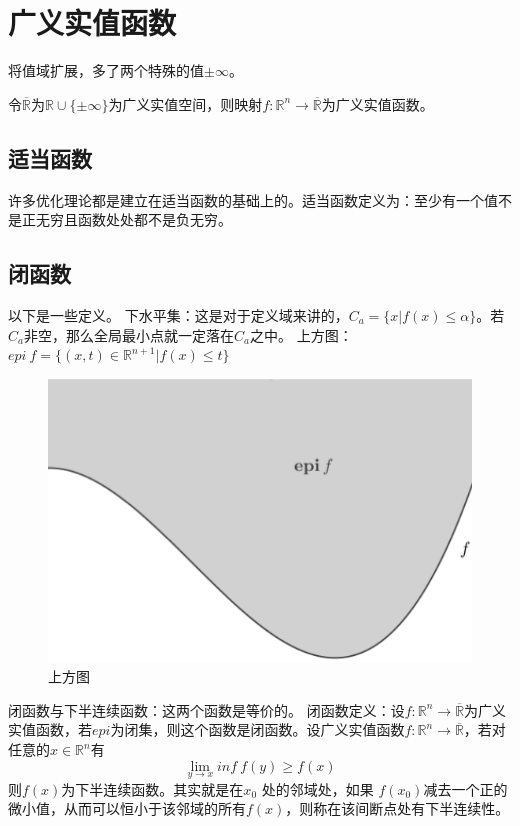 \documentclass{article}
\begin{document}
\section{广义实值函数}
将值域扩展，多了两个特殊的值$\pm\infty$。
\begin{definition}
    令$\overline{\mathbb {R}}$为$\mathbb {R} \cup \{ \pm\infty \}$为广义实值空间，则映射$f:\mathbb {R}^n \rightarrow \overline{\mathbb {R}} $为广义实值函数。
\end{definition}
\subsection{适当函数}
许多优化理论都是建立在适当函数的基础上的。适当函数定义为：至少有一个值不是正无穷且函数处处都不是负无穷。
\subsection{闭函数}
以下是一些定义。
下水平集：这是对于定义域来讲的，$C_a=\{ x|f(x) \le \alpha \}$。若$C_a$非空，那么全局最小点就一定落在$C_a$之中。
上方图：$epi \ f=\{(x,t) \in \mathbb{R}^{n+1}| f(x) \le t\} $
\begin{figure}[h]
    \centering
    \includegraphics[scale=0.4]{3.png}
    \caption{上方图}
\end{figure}
闭函数与下半连续函数：这两个函数是等价的。
闭函数定义：设$f:\mathbb {R}^n \rightarrow \overline{\mathbb {R}} $为广义实值函数，若$epi$为闭集，则这个函数是闭函数。设广义实值函数$f:\mathbb {R}^n \rightarrow \overline{\mathbb {R}} $，若对任意的$x \in \mathbb{R}^n$有$$\lim\limits_{y \rightarrow x}inf \ f(y) \ge f(x) $$则$f(x) $为下半连续函数。其实就是在$x_0$ 处的邻域处，如果 $f(x_0) $减去一个正的微小值，从而可以恒小于该邻域的所有$f(x)$，则称在该间断点处有下半连续性。
\end{document}
